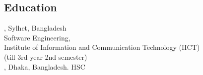 \documentclass[mm]{simple_style}
\begin{document}
\begin{resume}
\vspace{-3mm}
\section{Education}
, Sylhet, Bangladesh\\
Software Engineering,\\ Institute of Information and Communication Technology (IICT)  \\
\vspace{2mm}
 (till 3rd year 2nd semester)\\
, Dhaka, Bangladesh. 
HSC
 \hspace\\
\vspace{-3ex}
\sectionline
\vspace{-3mm}

\end{resume}
\end{document}
